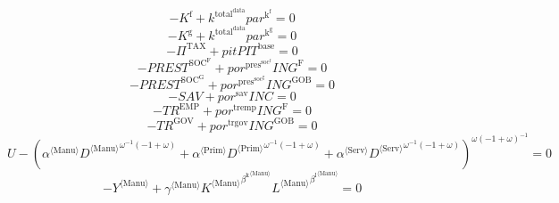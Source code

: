 \begin{equation}
-K^{\mathrm{f}} + {k^{\mathrm{total}^{\mathrm{data}}}} {{p\!a\!r}^{\mathrm{k}^{\mathrm{f}}}} = 0
\end{equation}
\begin{equation}
-K^{\mathrm{g}} + {k^{\mathrm{total}^{\mathrm{data}}}} {{p\!a\!r}^{\mathrm{k}^{\mathrm{g}}}} = 0
\end{equation}
\begin{equation}
-\Pi^{\mathrm{TAX}} + {{p\!i\!t}} {{P\!I\!T}^{\mathrm{base}}} = 0
\end{equation}
\begin{equation}
-{P\!R\!E\!S\!T}^{\mathrm{SOC}^{\mathrm{F}}} + {{p\!o\!r}^{\mathrm{pres}^{\mathrm{soc}^{\mathrm{f}}}}} {{I\!N\!G}^{\mathrm{F}}} = 0
\end{equation}
\begin{equation}
-{P\!R\!E\!S\!T}^{\mathrm{SOC}^{\mathrm{G}}} + {{p\!o\!r}^{\mathrm{pres}^{\mathrm{soc}^{\mathrm{g}}}}} {{I\!N\!G}^{\mathrm{GOB}}} = 0
\end{equation}
\begin{equation}
-{S\!A\!V} + {{p\!o\!r}^{\mathrm{sav}}} {{I\!N\!C}} = 0
\end{equation}
\begin{equation}
-{T\!R}^{\mathrm{EMP}} + {{p\!o\!r}^{\mathrm{tremp}}} {{I\!N\!G}^{\mathrm{F}}} = 0
\end{equation}
\begin{equation}
-{T\!R}^{\mathrm{GOV}} + {{p\!o\!r}^{\mathrm{trgov}}} {{I\!N\!G}^{\mathrm{GOB}}} = 0
\end{equation}
\begin{equation}
U - \left({{\alpha}^{\langle \mathrm{\mathrm{Manu}}\rangle}} {{{D}^{\langle \mathrm{Manu}\rangle}}^{{\omega}^{-1} \left(-1 + \omega\right)}} + {{\alpha}^{\langle \mathrm{\mathrm{Prim}}\rangle}} {{{D}^{\langle \mathrm{Prim}\rangle}}^{{\omega}^{-1} \left(-1 + \omega\right)}} + {{\alpha}^{\langle \mathrm{\mathrm{Serv}}\rangle}} {{{D}^{\langle \mathrm{Serv}\rangle}}^{{\omega}^{-1} \left(-1 + \omega\right)}}\right)^{{\omega} \left(-1 + \omega\right)^{-1}} = 0
\end{equation}
\begin{equation}
-{Y}^{\langle \mathrm{Manu}\rangle} + {{\gamma}^{\langle \mathrm{\mathrm{Manu}}\rangle}} {{{K}^{\langle \mathrm{Manu}\rangle}}^{{\beta^{\mathrm{k}}}^{\langle \mathrm{\mathrm{Manu}}\rangle}}} {{{L}^{\langle \mathrm{Manu}\rangle}}^{{\beta^{\mathrm{l}}}^{\langle \mathrm{\mathrm{Manu}}\rangle}}} = 0
\end{equation}
